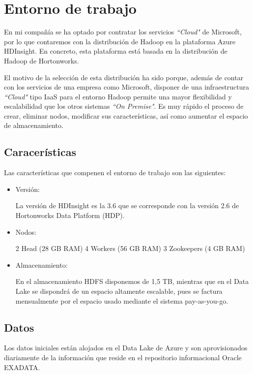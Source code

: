 \section{Entorno de trabajo}

En mi compañía se ha optado por contratar los servicios \textit{``Cloud"} de Microsoft, por lo que contaremos con la distribución de Hadoop en la plataforma Azure HDInsight\cite{yadav}. En concreto, esta plataforma está basada en la distribución de Hadoop de Hortonworks.

El motivo de la selección de esta distribución ha sido porque, además de contar con los servicios de una empresa como Microsoft, disponer de una infraestructura \textit{``Cloud"} tipo IaaS para el entorno Hadoop permite una mayor flexibilidad y escalabilidad que los otros sistemas \textit{``On Premise"}. Es muy rápido el proceso de crear, eliminar nodos, modificar sus características, así como aumentar el espacio de almacenamiento. 

\subsection{Caracerísticas}
Las características que compenen el entorno de trabajo son las siguientes:
\begin{itemize}
    \item Versión:

La versión de HDInsight es la 3.6 que se corresponde con la versión 2.6 de Hortonworks Data Platform (HDP). 

    \item Nodos:

2 Head (28 GB RAM) 
4 Workers (56 GB RAM) 
3 Zookeepers (4 GB RAM) 

    \item Almacenamiento:

En el almacenamiento HDFS disponemos de 1,5 TB, mientras que en el Data Lake se dispondrá de un espacio altamente escalable, pues se factura mensualmente por el espacio usado mediante el sistema pay-as-you-go. 
\end{itemize}

\subsection{Datos}

Los datos iniciales están alojados en el Data Lake de Azure y son aprovisionados diariamente de la información que reside en el repositorio informacional Oracle EXADATA. 

